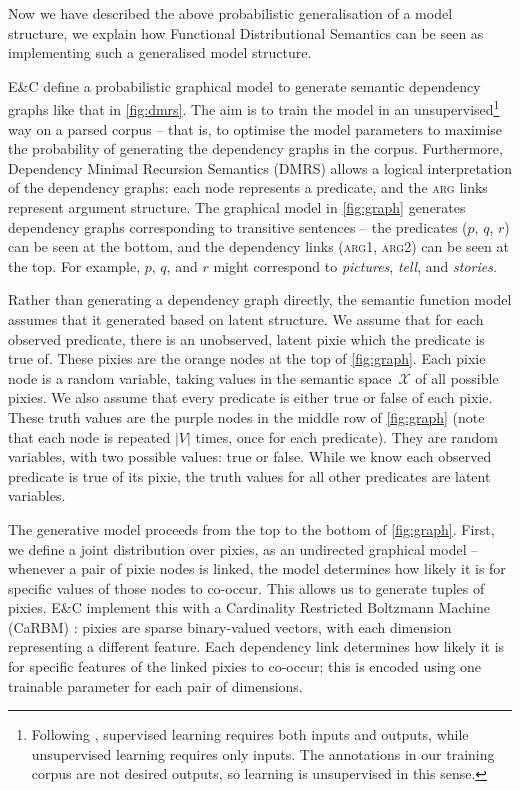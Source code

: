 \documentclass[a4paper,11pt]{article}
\begin{document}
Now we have described the above probabilistic generalisation of a model structure,
we explain how Functional Distributional Semantics can be seen as implementing such a generalised model structure.

E\&C define a probabilistic graphical model
to generate semantic dependency graphs like that in \cref{fig:dmrs}.
The aim is to train the model in an unsupervised\footnote{%
  Following \citet{ghahramani2004unsupervised},
  supervised learning requires both inputs and outputs, while
  unsupervised learning requires only inputs.
  The annotations in our training corpus are not desired outputs,
  so learning is unsupervised in this sense.
}
way on a parsed corpus --
that is, to optimise the model parameters
to maximise the probability of generating the dependency graphs in the corpus.
Furthermore, Dependency Minimal Recursion Semantics
(DMRS) \citep{copestake2009dmrs}
allows a logical interpretation of the dependency graphs:
each node represents a predicate,
and the \textsc{arg} links represent argument structure.
The graphical model in \cref{fig:graph}
generates dependency graphs corresponding to transitive sentences --
the predicates ($p$, $q$, $r$) can be seen at the bottom,
and the dependency links (\textsc{arg1}, \textsc{arg2}) can be seen at the top.
For example, $p$, $q$, and $r$ might correspond to
\textit{pictures}, \textit{tell}, and \textit{stories}.

Rather than generating a dependency graph directly,
the semantic function model assumes that it generated based on latent structure.
We assume that for each observed predicate,
there is an unobserved, latent pixie which the predicate is true of.
These pixies are the orange nodes at the top of \cref{fig:graph}.
Each pixie node is a random variable,
taking values in the semantic space~$\mathcal{X}$ of all possible pixies.
We also assume that every predicate is either true or false of each pixie.
These truth values are the purple nodes in the middle row of \cref{fig:graph}
(note that each node is repeated $|V|$ times, once for each predicate).
They are random variables, with two possible values: true or false.
While we know each observed predicate is true of its pixie,
the truth values for all other predicates are latent variables.

The generative model proceeds from the top to the bottom of \cref{fig:graph}.
First, we define a joint distribution over pixies,
as an undirected graphical model --
whenever a pair of pixie nodes is linked,
the model determines how likely it is for specific values of those nodes to co-occur.
This allows us to generate tuples of pixies.
E\&C implement this with a Cardinality Restricted Boltzmann Machine (CaRBM) \citep{swersky2012carbm}:
pixies are sparse binary-valued vectors,
with each dimension representing a different feature.
Each dependency link determines how likely it is for specific features of the linked pixies to co-occur;
this is encoded using one trainable parameter for each pair of dimensions.
\end{document}
